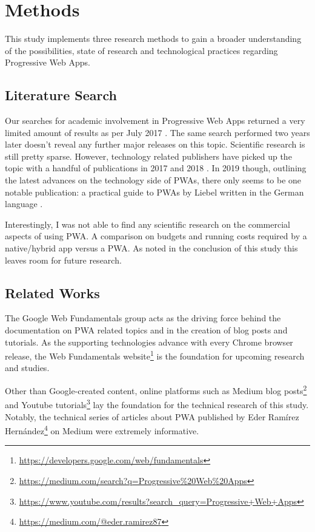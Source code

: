 \chapter{Methods}

This study implements three research methods to gain a broader understanding of the possibilities, state of research and technological practices regarding Progressive Web Apps.

\section{Literature Search}

Our searches for academic involvement in Progressive Web Apps returned a very limited amount of results as per July 2017 \citep{biorn-hansenProgressiveWebApps2018}. The same search performed two years later doesn't reveal any further major releases on this topic. Scientific research is still pretty sparse. However, technology related publishers have picked up the topic with a handful of publications in 2017 and 2018 \citep{humeProgressiveWebApps2018,aterBuildingProgressiveWeb2017}. In 2019 though, outlining the latest advances on the technology side of PWAs, there only seems to be one notable publication: a practical guide to PWAs by Liebel written in the German language \citep{liebelProgressiveWebApps2019}.

Interestingly, I was not able to find any scientific research on the commercial aspects of using PWA. A comparison on budgets and running costs required by a native/hybrid app versus a PWA. As noted in the conclusion of this study this leaves room for future research.

\section{Related Works}
The Google Web Fundamentals group acts as the driving force behind the documentation on PWA related topics and in the creation of blog posts and tutorials. As the supporting technologies advance with every Chrome browser release, the Web Fundamentals website\footnote{\url{https://developers.google.com/web/fundamentals}} is the foundation for upcoming research and studies.

Other than Google-created content, online platforms such as Medium blog posts\footnote{\url{https://medium.com/search?q=Progressive\%20Web\%20Apps}} and Youtube tutorials\footnote{\url{https://www.youtube.com/results?search_query=Progressive+Web+Apps}} lay the foundation for the technical research of this study. Notably, the technical series of articles about PWA published by Eder Ramírez Hernández\footnote{\url{https://medium.com/@eder.ramirez87}} on Medium were extremely informative.

